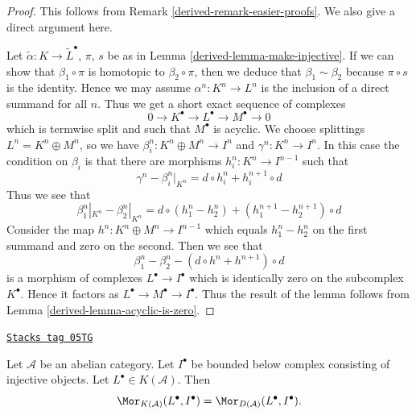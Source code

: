 \begin{proof}

This follows from
Remark \ref{derived-remark-easier-proofs}.
We also give a direct argument here.

\medskip\noindent
Let $\tilde \alpha : K \to \tilde L^\bullet$, $\pi$, $s$ be as in
Lemma \ref{derived-lemma-make-injective}. If we can show that $\beta_1 \circ\pi$
is homotopic to $\beta_2 \circ \pi$, then we deduce that
$\beta_1 \sim \beta_2$ because $\pi \circ s$ is the identity.
Hence we may assume $\alpha^n : K^n \to L^n$ is the
inclusion of a direct summand for all $n$. Thus we get a
short exact sequence of complexes
$$
0 \to K^\bullet \to L^\bullet \to M^\bullet \to 0
$$
which is termwise split and such that $M^\bullet$ is acyclic.
We choose splittings $L^n = K^n \oplus M^n$, so we have
$\beta_i^n : K^n \oplus M^n \to I^n$ and $\gamma^n : K^n \to I^n$.
In this case the condition on $\beta_i$ is that there are morphisms
$h_i^n : K^n \to I^{n - 1}$ such that
$$
\gamma^n - \beta_i^n|_{K^n} = d \circ h_i^n + h_i^{n + 1} \circ d
$$
Thus we see that
$$
\beta_1^n|_{K^n} - \beta_2^n|_{K^n}
=
d \circ (h_1^n - h_2^n) + (h_1^{n + 1} - h_2^{n + 1}) \circ d
$$
Consider the map $h^n : K^n \oplus M^n \to I^{n - 1}$ which
equals $h_1^n - h_2^n$ on the first summand and zero on the second.
Then we see that
$$
\beta_1^n - \beta_2^n
-
(d \circ h^n + h^{n + 1}) \circ d
$$
is a morphism of complexes $L^\bullet \to I^\bullet$
which is identically zero on the subcomplex $K^\bullet$.
Hence it factors as $L^\bullet \to M^\bullet \to I^\bullet$.
Thus the result of the lemma follows from Lemma \ref{derived-lemma-acyclic-is-zero}.
\end{proof}

\begin{lemma}
\label{derived-lemma-morphisms-into-injective-complex}
\href{https://stacks.math.columbia.edu/tag/05TG}{\texttt{Stacks tag 05TG}}

Let $\mathcal{A}$ be an abelian category.
Let $I^\bullet$ be bounded below complex consisting of injective
objects. Let $L^\bullet \in K(\mathcal{A})$. Then
$$
\Mor_{K(\mathcal{A})}(L^\bullet, I^\bullet)
=
\Mor_{D(\mathcal{A})}(L^\bullet, I^\bullet).
$$
\end{lemma}

